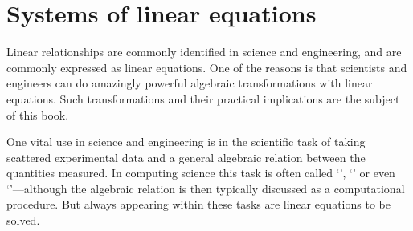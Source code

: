 
\chapter{Systems of linear equations}
\label{ch:sle}

\minitoc
{}


Linear relationships are commonly identified in science and engineering, and are commonly expressed as linear equations.
One of the reasons is that scientists and engineers can do amazingly powerful algebraic transformations with linear equations.
Such transformations and their practical implications are the subject of this book.

One vital use in science and engineering is in the scientific task of taking scattered experimental data and  a general algebraic relation between the quantities measured.
In computing science this task is often called `', `' or even `'---although  the algebraic relation is then typically discussed as a computational procedure.
But always appearing within these tasks are linear equations to be solved.

